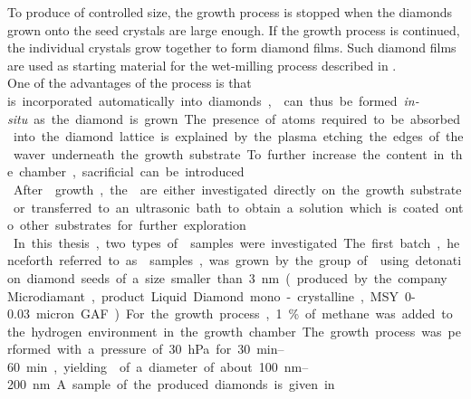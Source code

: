 	To produce \nds of controlled size, the growth process is stopped when the diamonds grown onto the seed crystals are large enough.
	If the growth process is continued, the individual crystals grow together to form diamond films.
	Such diamond films are used as starting material for the wet-milling process described in .
	\\
	One of the advantages of the \CVD process is that \si is incorporated automatically into diamonds, \sivs can thus be formed \textit{in-situ} as the diamond is grown. The presence of \si atoms required to be absorbed into the diamond lattice is explained by the plasma etching the edges of the \si waver underneath the growth substrate.
	To further increase the \si content in the chamber, sacrificial \si can be introduced.
	\\
	After \nd growth, the \nds are either investigated directly on the growth substrate or transferred to an ultrasonic bath to obtain a solution which is coated onto other substrates for further exploration.
	\\
	In this thesis, two types of \nds samples were investigated.
	The first batch, henceforth referred to as \CVD samples, was grown by the group of \schreck using detonation diamond seeds of a size smaller than \SI{3}{nm}(produced by the company Microdiamant, product Liquid Diamond mono-crystalline, MSY {0-0.03} micron GAF).
	For the growth process, \SI{1}{\percent} of methane was added to the hydrogen environment in the growth chamber.
	The growth process was performed with a pressure of \SI{30}{hPa} for \SIrange{30}{60}{min}, yielding \nds of a diameter of about \SIrange{100}{200}{nm}. A sample of the produced diamonds is given in .
	\\


